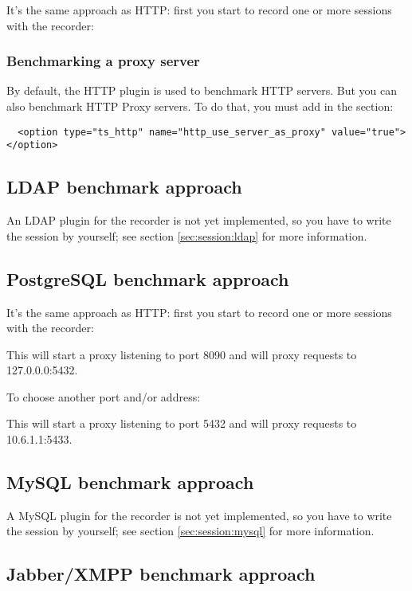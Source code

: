 \documentclass{TSUNG-en}
\begin{document}
It's the same approach as HTTP: first you start to record one or more
sessions with the recorder:

\subsubsection{Benchmarking a proxy server}

By default, the HTTP plugin is used to benchmark HTTP servers. But you
can also benchmark HTTP Proxy servers. To do that, you must add in the
 section:

\begin{Verbatim}
  <option type="ts_http" name="http_use_server_as_proxy" value="true"></option>
\end{Verbatim}


\subsection{LDAP benchmark approach}

An LDAP plugin for the recorder is not yet implemented, so you have to
write the session by yourself; see section \ref{sec:session:ldap} for
more information.

\subsection{PostgreSQL benchmark approach}

It's the same approach as HTTP: first you start to record one or more
sessions with the recorder:

This will start a proxy listening to port 8090 and will proxy requests
to 127.0.0.0:5432.

To choose another port and/or address:

This will start a proxy listening to port 5432 and will proxy requests
to 10.6.1.1:5433.

\subsection{MySQL benchmark approach}

A MySQL plugin for the recorder is not yet implemented, so you have to
write the session by yourself; see section \ref{sec:session:mysql} for
more information.

\subsection{Jabber/XMPP benchmark approach}
\end{document}
